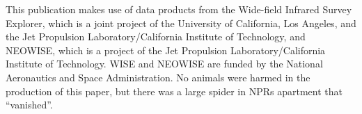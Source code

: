 \documentclass[fleqn,usenatbib]{mnras}
\begin{document}
This publication makes use of data products from the Wide-field
Infrared Survey Explorer, which is a joint project of the University
of California, Los Angeles, and the Jet Propulsion
Laboratory/California Institute of Technology, and NEOWISE, which is a
project of the Jet Propulsion Laboratory/California Institute of
Technology. WISE and NEOWISE are funded by the National Aeronautics
and Space Administration. No animals were harmed in the production of
this paper, but there was a large spider in NPRs apartment that
``vanished''.





\bsp	%
\label{lastpage}
\end{document}
